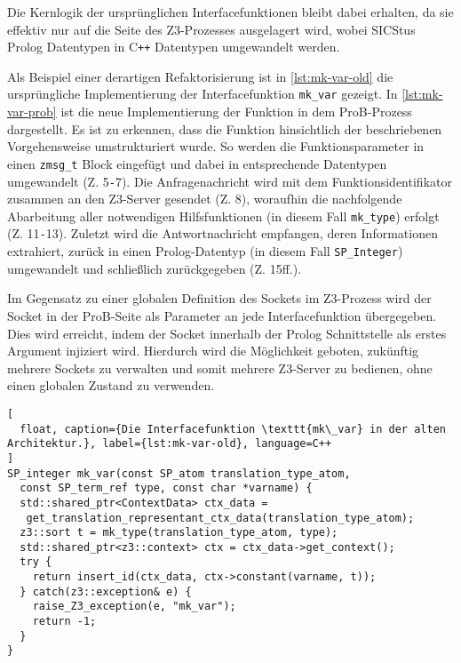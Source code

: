 Die Kernlogik der ursprünglichen Interfacefunktionen bleibt dabei erhalten, da sie effektiv nur auf die Seite des Z3-Prozesses ausgelagert wird,
wobei SICStus Prolog Datentypen in C\texttt{++} Datentypen umgewandelt werden.

Als Beispiel einer derartigen Refaktorisierung ist in \cref{lst:mk-var-old} die ursprüngliche Implementierung der Interfacefunktion \texttt{mk\_var} gezeigt.
In \cref{lst:mk-var-prob} ist die neue Implementierung der Funktion in dem ProB-Prozess dargestellt.
Es ist zu erkennen, dass die Funktion hinsichtlich der beschriebenen Vorgehensweise umstrukturiert wurde.
So werden die Funktionsparameter in einen \texttt{zmsg\_t} Block eingefügt und dabei in entsprechende Datentypen umgewandelt (Z. 5\texttt{-}7).
Die Anfragenachricht wird mit dem Funktionsidentifikator zusammen an den Z3-Server gesendet (Z. 8), woraufhin
die nachfolgende Abarbeitung aller notwendigen Hilfsfunktionen (in diesem Fall \texttt{mk\_type}) erfolgt (Z. 11\texttt{-}13).
Zuletzt wird die Antwortnachricht empfangen, deren Informationen extrahiert, zurück in einen Prolog-Datentyp (in diesem Fall \texttt{SP\_Integer}) umgewandelt und schließlich zurückgegeben (Z. 15ff.).

Im Gegensatz zu einer globalen Definition des Sockets im Z3-Prozess wird der Socket in der ProB-Seite als Parameter an jede Interfacefunktion übergegeben.
Dies wird erreicht, indem der Socket innerhalb der Prolog Schnittstelle als erstes Argument injiziert wird.
Hierdurch wird die Möglichkeit geboten, zukünftig mehrere Sockets zu verwalten und somit mehrere Z3-Server zu bedienen, ohne einen globalen Zustand zu verwenden.

\begin{lstlisting}[
  float, caption={Die Interfacefunktion \texttt{mk\_var} in der alten Architektur.}, label={lst:mk-var-old}, language=C++
]
SP_integer mk_var(const SP_atom translation_type_atom,
  const SP_term_ref type, const char *varname) {
  std::shared_ptr<ContextData> ctx_data =
   get_translation_representant_ctx_data(translation_type_atom);
  z3::sort t = mk_type(translation_type_atom, type);
  std::shared_ptr<z3::context> ctx = ctx_data->get_context();
  try {
    return insert_id(ctx_data, ctx->constant(varname, t));
  } catch(z3::exception& e) {
    raise_Z3_exception(e, "mk_var");
    return -1;
  }
}
\end{lstlisting}

